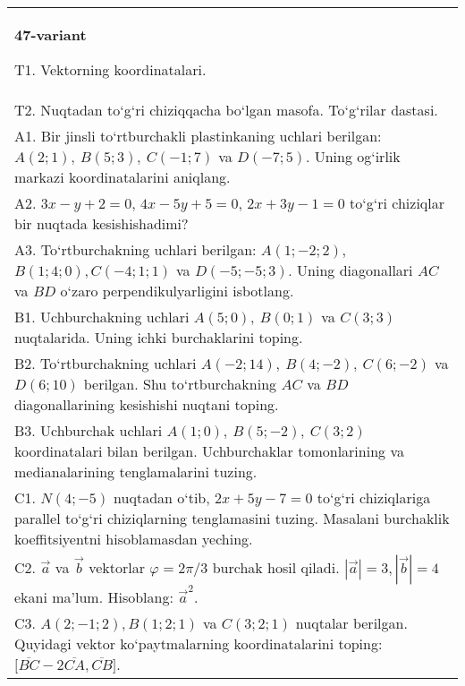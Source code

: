 \documentclass{article}
\begin{document}
\begin{tabular}{m{17cm}}
\textbf{47-variant}

T1. 
Vektorning koordinatalari.
 \\
T2. 
Nuqtadan to‘g‘ri chiziqqacha bo‘lgan masofa. To‘g‘rilar dastasi.
 \\
A1. 
Bir jinsli to‘rtburchakli plastinkaning uchlari berilgan:
$A (2;1), \ B (5;3), \ C (-1;7) $ va $D (-7;5) $. Uning og‘irlik markazi
koordinatalarini aniqlang.
 \\
A2. 
$3x-y+2=0$, $4x-5y+5=0$, $2x+3y-1=0$
to‘g‘ri chiziqlar bir nuqtada kesishishadimi?
 \\
A3. 
To‘rtburchakning uchlari berilgan:
$A (1; - 2;2) $, $B (1;4;0),C (- 4;1;1) $ va $D (- 5; -5;3) $. Uning diagonallari $AC$ va $BD$ o‘zaro
perpendikulyarligini isbotlang.
 \\
B1. 
Uchburchakning uchlari \(A (5;0),\ B (0;1) \) va \(C (3;3) \)
nuqtalarida. Uning ichki burchaklarini toping.
 \\
B2. 
To‘rtburchakning uchlari
\(A (-2;14),\ B (4;-2),\ C (6;-2) \) va \(D (6;10) \) berilgan. Shu
to‘rtburchakning $AC$ va $BD$ diagonallarining kesishishi
nuqtani toping.
 \\
B3. 
Uchburchak uchlari \(A (1;0),\ B (5;-2),\ C (3;2) \)
koordinatalari bilan berilgan. Uchburchaklar tomonlarining va
medianalarining tenglamalarini tuzing.
 \\
C1. 
\(N (4;-5) \) nuqtadan o‘tib, $2x+5y-7=0$
to‘g‘ri chiziqlariga parallel to‘g‘ri chiziqlarning tenglamasini tuzing. Masalani burchaklik
koeffitsiyentni hisoblamasdan yeching.
 \\
C2. 
$\vec{a}$ va $\vec{b}$ vektorlar $\varphi = 2\pi/3$ burchak hosil qiladi. $|\vec{a}| = 3,|\vec{b}| = 4$ ekani ma’lum. Hisoblang:
${\vec{a}}^{2}$.
 \\
C3. 
$A (2; -1;2),B (1;2; 1) $ va $C (3;2;1) $ nuqtalar berilgan. Quyidagi vektor ko‘paytmalarning koordinatalarini toping:
$\lbrack\overline{BC} - 2\overline{CA},\overline{CB}\rbrack$. \\

\end{tabular}
\vspace{1cm}
\end{document}
